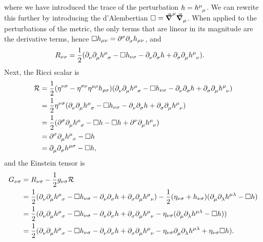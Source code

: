 where we have introduced the trace of the perturbation $h = \tensor{h}{^{\mu}_{\mu}}$. We can rewrite this further by introducing the d'Alembertian $\square = \dcov[\mu]{}{\dcov{\mu}{}}$. When applied to the perturbations of the metric, the only terms that are linear in its magnitude are the derivative terms, hence $\square h_{\mu\nu} = \del[\sigma]{}{\del{\sigma}{h_{\mu\nu}}}$, and
\begin{align*}
	R_{\nu\sigma} &= \frac{1}{2}(\del{\nu}{\del{\mu}{\tensor{h}{^{\mu}_{\sigma}}}} - \square h_{\nu\sigma} - \del{\nu}{\del{\sigma}{h}} + \del{\sigma}{\del{\mu}{\tensor{h}{^{\mu}_{\nu}}}}).
\end{align*}
Next, the Ricci scalar is
\begin{align*}
	\R &= \frac{1}{2}(\eta^{\nu\sigma} -\eta^{\sigma\nu}\eta^{\mu\rho}h_{\rho\sigma})(\del{\nu}{\del{\mu}{\tensor{h}{^{\mu}_{\sigma}}}} - \square h_{\nu\sigma} - \del{\nu}{\del{\sigma}{h}} + \del{\sigma}{\del{\mu}{\tensor{h}{^{\mu}_{\nu}}}}) \\
	   &= \frac{1}{2}\eta^{\nu\sigma}(\del{\nu}{\del{\mu}{\tensor{h}{^{\mu}_{\sigma}}}} - \square h_{\nu\sigma} - \del{\nu}{\del{\sigma}{h}} + \del{\sigma}{\del{\mu}{\tensor{h}{^{\mu}_{\nu}}}}) \\
	   &= \frac{1}{2}(\del[\sigma]{}{\del{\mu}{\tensor{h}{^{\mu}_{\sigma}}}} - \square h - \square h + \del[\nu]{}{\del{\mu}{\tensor{h}{^{\mu}_{\nu}}}}) \\
	   &= \del[\sigma]{}{\del{\mu}{\tensor{h}{^{\mu}_{\sigma}}}} - \square h \\
	   &= \del{\mu}{\del{\sigma}{\tensor{h}{^{\mu\sigma}}}} - \square h,
\end{align*}
and the Einstein tensor is
\begin{align*}
	G_{\nu\sigma} &= R_{\nu\sigma} - \frac{1}{2}g_{\nu\sigma}\R \\
	              &= \frac{1}{2}(\del{\nu}{\del{\mu}{\tensor{h}{^{\mu}_{\sigma}}}} - \square h_{\nu\sigma} - \del{\nu}{\del{\sigma}{h}} + \del{\sigma}{\del{\mu}{\tensor{h}{^{\mu}_{\nu}}}}) - \frac{1}{2}(\eta_{\nu\sigma} + h_{\nu\sigma})(\del{\mu}{\del{\lambda}{\tensor{h}{^{\mu\lambda}}}} - \square h) \\
	              &= \frac{1}{2}(\del{\nu}{\del{\mu}{\tensor{h}{^{\mu}_{\sigma}}}} - \square h_{\nu\sigma} - \del{\nu}{\del{\sigma}{h}} + \del{\sigma}{\del{\mu}{\tensor{h}{^{\mu}_{\nu}}}} - \eta_{\nu\sigma}(\del{\mu}{\del{\lambda}{\tensor{h}{^{\mu\lambda}}}} - \square h)) \\
	              &= \frac{1}{2}(\del{\nu}{\del{\mu}{\tensor{h}{^{\mu}_{\sigma}}}} - \square h_{\nu\sigma} - \del{\nu}{\del{\sigma}{h}} + \del{\sigma}{\del{\mu}{\tensor{h}{^{\mu}_{\nu}}}} - \eta_{\nu\sigma}\del{\mu}{\del{\lambda}{\tensor{h}{^{\mu\lambda}}}} + \eta_{\nu\sigma}\square h).
\end{align*}

